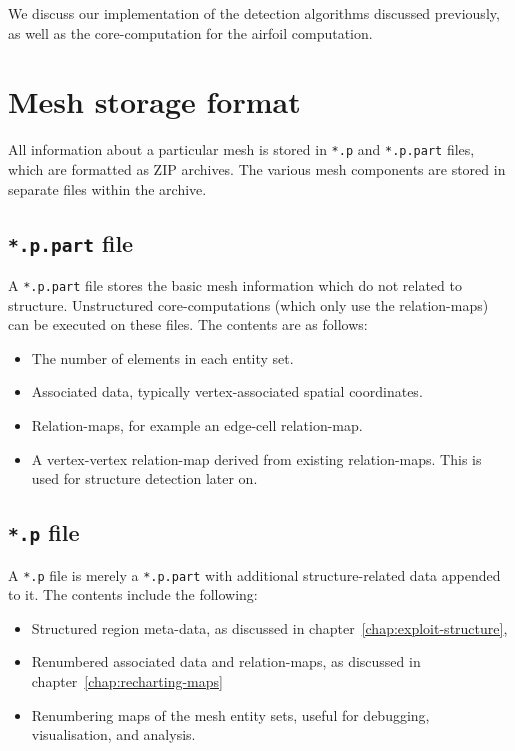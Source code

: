 \label{chap:implementation}
We discuss our implementation of the detection algorithms discussed previously, as well as the core-computation for the airfoil computation.

\section{Mesh storage format}
All information about a particular mesh is stored in \texttt{*.p} and \texttt{*.p.part} files, which are formatted as ZIP archives. The various mesh components are stored in separate files within the archive.

\subsection{\texttt{*.p.part} file}
\label{subsec:p-part}
A \texttt{*.p.part} file stores the basic mesh information which do not related to structure. Unstructured core-computations (which only use the relation-maps) can be executed on these files. The contents are as follows:
\begin{itemize}
\item The number of elements in each entity set.
\item Associated data, typically vertex-associated spatial coordinates.
\item Relation-maps, for example an edge-cell relation-map.
\item A vertex-vertex relation-map derived from existing relation-maps. This is used for structure detection later on.
\end{itemize}

\subsection{\texttt{*.p} file}
A \texttt{*.p} file is merely a \texttt{*.p.part} with additional structure-related data appended to it. The contents include the following:
\begin{itemize}
\item Structured region meta-data, as discussed in chapter~\ref{chap:exploit-structure},
\item Renumbered associated data and relation-maps, as discussed in chapter~\ref{chap:recharting-maps}
\item Renumbering maps of the mesh entity sets, useful for debugging, visualisation, and analysis.
\end{itemize}



